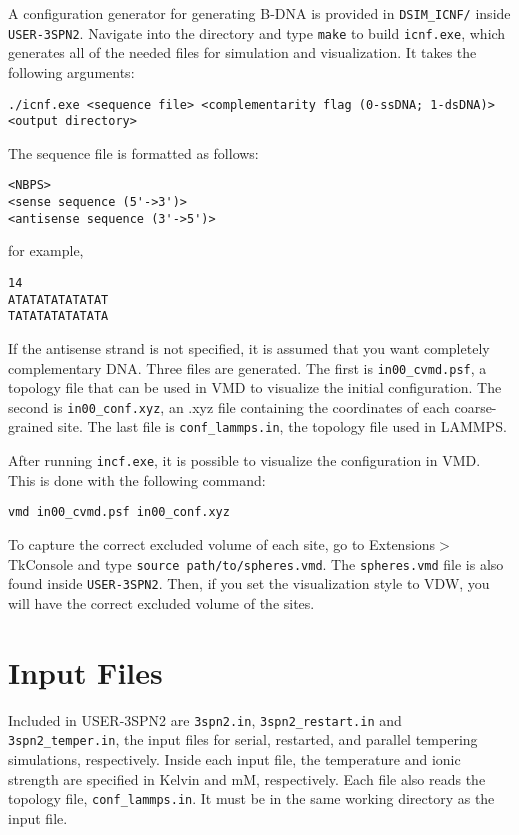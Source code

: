 \documentclass[11pt]{amsart}
\begin{document}
A configuration generator for generating B-DNA is provided in
\texttt{DSIM\_ICNF/} inside \texttt{USER-3SPN2}.  Navigate into the directory
and type \texttt{make} to build \texttt{icnf.exe}, which generates all of the
needed files for simulation and visualization.      It takes the following
arguments:
\begin{verbatim}
./icnf.exe <sequence file> <complementarity flag (0-ssDNA; 1-dsDNA)> <output directory>
\end{verbatim}
The sequence file is formatted as follows:
\begin{verbatim}
<NBPS>
<sense sequence (5'->3')>
<antisense sequence (3'->5')>
\end{verbatim}
for example,
\begin{verbatim}
14
ATATATATATATAT
TATATATATATATA
\end{verbatim}
If the antisense strand is not specified, it is assumed that you want
completely complementary DNA.  Three files are generated.  The first is
\texttt{in00\_cvmd.psf}, a topology file that can be used in VMD to visualize
the initial configuration.  The second is \texttt{in00\_conf.xyz}, an .xyz file
containing the coordinates of each coarse-grained site.  The last file is
\texttt{conf\_lammps.in}, the topology file used in LAMMPS.

After running \texttt{incf.exe}, it is possible to visualize the configuration
in VMD.  This is done with the following command:
\begin{verbatim}
vmd in00_cvmd.psf in00_conf.xyz
\end{verbatim}
To capture the correct excluded volume of each site, go to
Extensions$>$TkConsole and type \texttt{source path/to/spheres.vmd}.    The
\texttt{spheres.vmd} file is also found inside \texttt{USER-3SPN2}.  Then, if
you set the visualization style to VDW, you will have the correct excluded
volume of the sites. 

\section{Input Files}

Included in USER-3SPN2 are  \texttt{3spn2.in}, \texttt{3spn2\_restart.in} and \texttt{3spn2\_temper.in},
the input files for serial, restarted, and parallel tempering simulations, respectively.
Inside each input file, the temperature and ionic strength are specified in
Kelvin and mM, respectively.   Each file also reads the topology file,
\texttt{conf\_lammps.in}.  It must be in the same working directory as the
input file.
\end{document}
